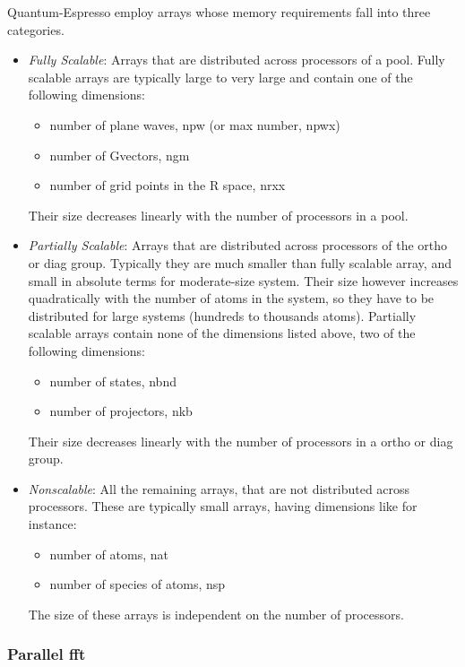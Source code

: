 \documentclass[12pt,a4paper]{article}
\begin{document}
Quantum-Espresso employ arrays whose memory requirements fall 
into three categories.
\begin{itemize}
\item {\em Fully Scalable}: 
Arrays that are distributed across processors of a pool.
Fully scalable arrays are typically large to very large and contain one 
of the following dimensions:
\begin{itemize}
\item number of plane waves, npw (or max number, npwx)
\item number of Gvectors, ngm
\item number of grid points in the R space, nrxx
\end{itemize}
Their size decreases linearly with the number of processors in a pool. 

\item {\em Partially Scalable}: 
Arrays that are distributed across processors of the
ortho or diag group. Typically they are much smaller than fully scalable
array, and small in absolute terms for moderate-size system. Their size
however increases quadratically with the number of atoms in the system,
so they have to be distributed for large systems (hundreds to thousands
atoms). Partially scalable arrays contain none of the dimensions listed 
above, two of the following dimensions:
\begin{itemize}
\item number of states, nbnd
\item number of projectors, nkb
\end{itemize}
Their size decreases linearly with the number of processors in a ortho
or diag group. 

\item
{\em Nonscalable}: All the remaining arrays, that are not distributed across
processors. These are typically small arrays, having dimensions like for
instance:
\begin{itemize}
\item number of atoms, nat
\item number of species of atoms, nsp
\end{itemize}
The size of these arrays is independent on the number of processors.
\end{itemize}

\subsubsection{ Parallel fft}
\end{document}

